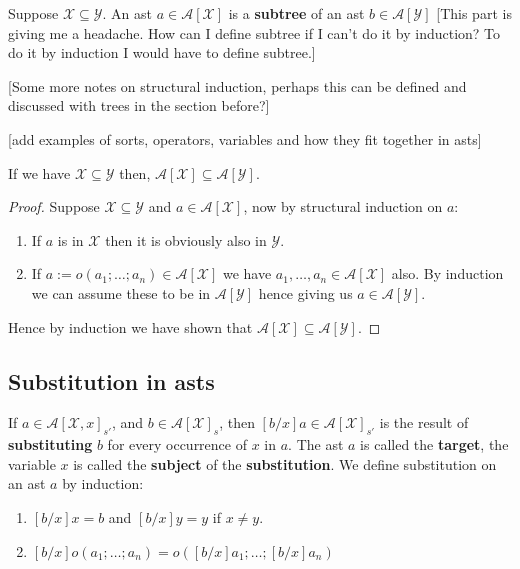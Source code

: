 \begin{defin}
    Suppose $\mathcal{X} \subseteq \mathcal{Y}$. An ast $a \in \mathcal{A}[\mathcal{X}]$ is a \textbf{subtree} of an ast $b \in \mathcal{A}[\mathcal{Y}]$ [This part is giving me a headache. How can I define subtree if I can't do it by induction? To do it by induction I would have to define subtree.]
\end{defin}



[Some more notes on structural induction, perhaps this can be defined and discussed with trees in the section before?]

[add examples of sorts, operators, variables and how they fit together in asts]

\begin{lemma}
    If we have $\mathcal{X} \subseteq \mathcal{Y}$ then, $\mathcal{A}[\mathcal{X}] \subseteq \mathcal{A}[\mathcal{Y}]$.
\end{lemma}
\begin{proof}
    Suppose $\mathcal{X} \subseteq \mathcal{Y}$ and $a \in \mathcal{A}[\mathcal{X}]$, now by structural induction on $a$:
    
    \begin{enumerate}
        \item If $a$ is in $\mathcal{X}$ then it is obviously also in $\mathcal{Y}$.
        \item If $a := o(a_1;\dots;a_n) \in \mathcal{A}[\mathcal{X}]$ we have $a_1, \dots, a_n\in \mathcal{A}[\mathcal{X}]$ also. By induction we can assume these to be in $\mathcal{A}[\mathcal{Y}]$ hence giving us $a \in \mathcal{A}[\mathcal{Y}]$.
    \end{enumerate}
    
    Hence by induction we have shown that $\mathcal{A}[\mathcal{X}] \subseteq \mathcal{A}[\mathcal{Y}]$.
\end{proof}

\subsection{Substitution in asts}

\begin{defin}[Substitution]\label{sub}
    If $a \in \mathcal{A}[\mathcal{X},x]_{s'}$, and $b \in \mathcal{A}[\mathcal{X}]_s$, then $[b/x]a \in \mathcal{A}[\mathcal{X}]_{s'}$ is the result of \textbf{substituting} $b$ for every occurrence of $x$ in $a$. The ast $a$ is called the \textbf{target}, the variable $x$ is called the \textbf{subject} of the \textbf{substitution}. We define substitution on an ast $a$ by induction:
    \begin{enumerate}
        \item $[b/x]x = b$ and $[b/x]y = y$ if $x\ne y$.
        \item $[b/x]o(a_1;\dots;a_n)=o([b/x]a_1;\dots;[b/x]a_n)$
    \end{enumerate}
\end{defin}

